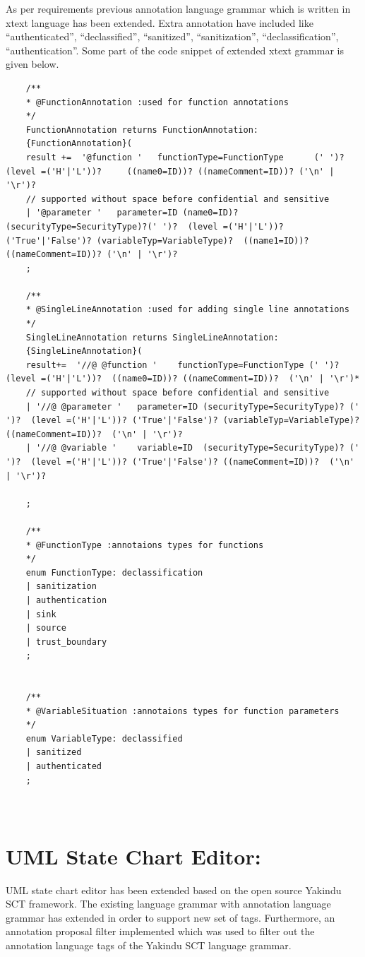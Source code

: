 As per requirements previous annotation language grammar which is written in xtext language has been extended. Extra annotation have included like \enquote{authenticated}, \enquote{declassified}, \enquote{sanitized}, \enquote{sanitization}, \enquote{declassification}, \enquote{authentication}. Some part of the code snippet of extended xtext grammar is given below.
\begin{lstlisting}
	/**
	* @FunctionAnnotation :used for function annotations
	*/ 
	FunctionAnnotation returns FunctionAnnotation:
	{FunctionAnnotation}( 
	result +=  '@function '   functionType=FunctionType      (' ')?                              (level =('H'|'L'))?     ((name0=ID))? ((nameComment=ID))? ('\n' | '\r')?
	// supported without space before confidential and sensitive
	| '@parameter '   parameter=ID (name0=ID)? (securityType=SecurityType)?(' ')?  (level =('H'|'L'))? ('True'|'False')? (variableTyp=VariableType)?  ((name1=ID))? ((nameComment=ID))? ('\n' | '\r')?	
	;
	
	/**
	* @SingleLineAnnotation :used for adding single line annotations
	*/ 
	SingleLineAnnotation returns SingleLineAnnotation:
	{SingleLineAnnotation}(
	result+=  '//@ @function '    functionType=FunctionType (' ')?                  (level =('H'|'L'))?  ((name0=ID))? ((nameComment=ID))?  ('\n' | '\r')*
	// supported without space before confidential and sensitive
	| '//@ @parameter '   parameter=ID (securityType=SecurityType)? (' ')?  (level =('H'|'L'))? ('True'|'False')? (variableTyp=VariableType)?  ((nameComment=ID))?  ('\n' | '\r')?
	| '//@ @variable '    variable=ID  (securityType=SecurityType)? (' ')?  (level =('H'|'L'))? ('True'|'False')? ((nameComment=ID))?  ('\n' | '\r')?
	
	;
	
	/**
	* @FunctionType :annotaions types for functions
	*/ 
	enum FunctionType: declassification 
	| sanitization
	| authentication
	| sink
	| source
	| trust_boundary
	;
	
	
	/**
	* @VariableSituation :annotaions types for function parameters
	*/ 
	enum VariableType: declassified 
	| sanitized
	| authenticated
	;
	
	
\end{lstlisting}

\section{UML State Chart Editor:}
UML state chart editor has been extended based on the open source Yakindu SCT \cite{ref_15_yakindu:sct}framework. The existing language grammar with
annotation language grammar has extended in order to support new set
of tags. Furthermore, an annotation proposal filter implemented which was used to filter out the annotation language tags of the Yakindu SCT language grammar.


